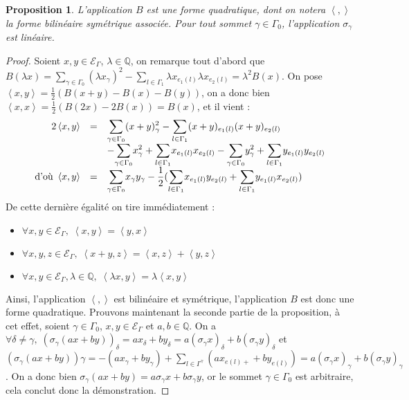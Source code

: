 \documentclass[a4paper,10pt]{article}
\newtheorem{prop}[]{Proposition}[section]
\newcommand{\ps}[2]{\left\langle#1,#2\right\rangle}
\newcommand{\EG}{\mathscr{E}_\Gamma}
\newcommand{\dps}{\displaystyle}
\begin{document}
		\begin{prop}
			L'application $B$ est une forme quadratique, dont on notera $\ps{}{}$ la forme bilinéaire symétrique associée. Pour tout sommet $\gamma\in\Gamma_0$, l'application $\sigma_\gamma$ est linéaire.
		\end{prop}
		\begin{proof}
			Soient $x,y\in\EG$, $\lambda\in\mathbb{Q}$, on remarque tout d'abord que $B(\lambda x)=\sum_{\gamma\in\Gamma_0}(\lambda x_\gamma)^2-\sum_{l\in\Gamma_1}\lambda x_{e_1(l)}\lambda x_{e_2(l)}=\lambda^2B(x)$. On pose $\ps{x}{y}=\frac{1}{2}(B(x+y)-B(x)-B(y))$, on a donc bien $\ps{x}{x}=\frac{1}{2}(B(2x)-2B(x))=B(x)$, et il vient :
			\[
		\begin{array}{>{\dps}r>{\dps}l>{\dps}l}
			2\ps{x}{y}&=& \underset{\gamma\in\Gamma_0}{\sum}(x+y)_\gamma^2 -\underset{l\in\Gamma_1}{\sum}(x+y)_{e_1(l)}(x+y)_{e_2(l)}\\
		&&-\underset{\gamma\in\Gamma_0}{\sum}x_\gamma^2 +\underset{l\in\Gamma_1}{\sum}x_{e_1(l)}x_{e_2(l)}-\underset{\gamma\in\Gamma_0}{\sum}y_\gamma^2 +\underset{l\in\Gamma_1}{\sum}y_{e_1(l)}y_{e_2(l)}\\
		\text{d'où }\ps{x}{y}&=&  \underset{\gamma\in\Gamma_0}{\sum}x_\gamma y_\gamma -\frac{1}{2}(\underset{l\in\Gamma_1}{\sum}x_{e_1(l)} y_{e_2(l)}+\underset{l\in\Gamma_1}{\sum}y_{e_1(l)} x_{e_2(l)})
		\end{array}
			\]
			De cette dernière égalité on tire immédiatement :
			\begin{itemize}
					\item $\forall x,y\in\EG,\; \ps{x}{y}=\ps{y}{x}$
					\item $\forall x,y,z\in\EG,\; \ps{x+y}{z}=\ps{x}{z}+\ps{y}{z}$
					\item $\forall x,y\in\EG,\lambda\in\mathbb Q,\;\ps{\lambda x}{y}=\lambda\ps{x}{y}$
			\end{itemize}
			Ainsi, l'application $\ps{}{}$ est bilinéaire et symétrique, l'application $B$ est donc une forme quadratique. Prouvons maintenant la seconde partie de la proposition, à cet effet, soient $\gamma\in\Gamma_0$, $x,y\in\EG$ et $a,b\in\mathbb Q$. On a $\forall\delta\neq\gamma,\;(\sigma_\gamma(ax+by))_\delta=ax_\delta+by_\delta=a(\sigma_\gamma x)_\delta+b(\sigma_\gamma y)_\delta$ et $(\sigma_\gamma (ax+by))\gamma=-(ax_\gamma+by_\gamma)+\sum_{l\in\Gamma^\gamma}(ax_{e(l)+}+by_{e(l)})=a(\sigma_\gamma x)_\gamma+b(\sigma_\gamma y)_\gamma$. On a donc bien $\sigma_\gamma(ax+by)=a\sigma_\gamma x+b\sigma_\gamma y$, or le sommet $\gamma\in\Gamma_{0}$ est arbitraire, cela conclut donc la démonstration.
		\end{proof}
\end{document}
